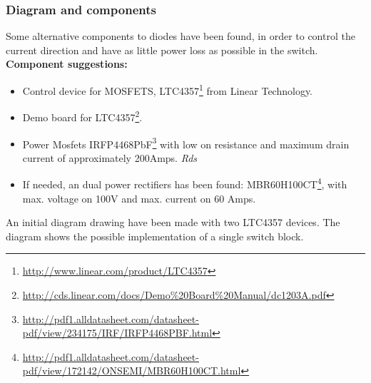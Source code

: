 \subsubsection{Diagram and components}
Some alternative components to diodes have been found, in order to control the current direction and have as little power loss as possible in the switch. 
\textbf{Component suggestions:}
\begin{itemize}
	\item Control device for MOSFETS, LTC4357\footnote{\url{http://www.linear.com/product/LTC4357}} from Linear Technology.
	\item Demo board for LTC4357\footnote{\url{http://cds.linear.com/docs/Demo\%20Board\%20Manual/dc1203A.pdf}}.
	\item Power Mosfets IRFP4468PbF\footnote{\url{http://pdf1.alldatasheet.com/datasheet-pdf/view/234175/IRF/IRFP4468PBF.html}} with low on resistance and maximum drain current of approximately 200Amps. \textit{Rds}
	\item If needed, an dual power rectifiers has been found: MBR60H100CT\footnote{\url{http://pdf1.alldatasheet.com/datasheet-pdf/view/172142/ONSEMI/MBR60H100CT.html}}, with max. voltage on 100V and max. current on 60 Amps.
\end{itemize}
An initial diagram drawing have been made with two LTC4357 devices. The diagram shows the possible implementation of a single switch block.

